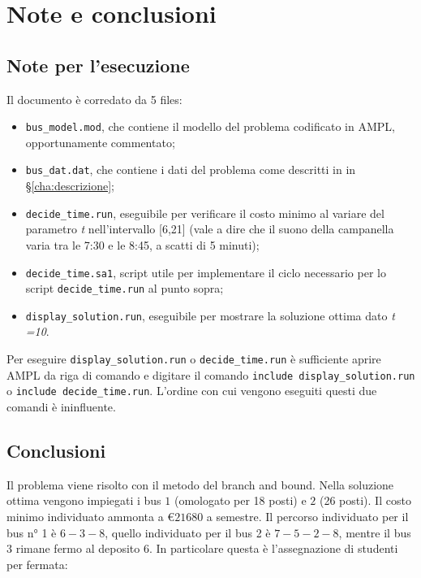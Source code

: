 \chapter{Note e conclusioni}

\ifpdf
    \graphicspath{{Chapter4/Figs/Raster/}{Chapter4/Figs/PDF/}{Chapter3/Figs/}}
\else
    \graphicspath{{Chapter4/Figs/Vector/}{Chapter4/Figs/}}
\fi

\section{Note per l'esecuzione}
\label{sec:note}
Il documento è corredato da 5 files:

\begin{itemize}
  \item \texttt{bus\_model.mod}, che contiene il modello del problema codificato in AMPL, opportunamente commentato;
  \item \texttt{bus\_dat.dat}, che contiene i dati del problema come descritti in in §\ref{cha:descrizione};
  \item \texttt{decide\_time.run}, eseguibile per verificare il costo minimo al variare del parametro \textit{t} nell'intervallo [6,21] (vale a dire che il suono della campanella varia tra le 7:30 e le 8:45, a scatti di 5 minuti);
  \item \texttt{decide\_time.sa1}, script utile per implementare il ciclo necessario per lo script \texttt{decide\_time.run} al punto sopra; 
  \item \texttt{display\_solution.run}, eseguibile per mostrare la soluzione ottima dato \textit{t =10}.
\end{itemize}

Per eseguire \texttt{display\_solution.run} o \texttt{decide\_time.run} è sufficiente aprire AMPL da riga di comando e digitare il comando \texttt{include display\_solution.run} o \texttt{include decide\_time.run}. L'ordine con cui vengono eseguiti questi due comandi è ininfluente.

\section{Conclusioni}

Il problema viene risolto con il metodo del branch and bound. Nella soluzione ottima vengono impiegati i bus $1$ (omologato per 18 posti) e $2$ (26 posti). Il costo minimo individuato ammonta a €$21680$ a semestre.
Il percorso individuato per il bus n° 1 è $6-3-8$, quello individuato per il bus 2 è $7-5-2-8$, mentre il bus $3$ rimane fermo al deposito $6$.
In particolare questa è l'assegnazione di studenti per fermata:

